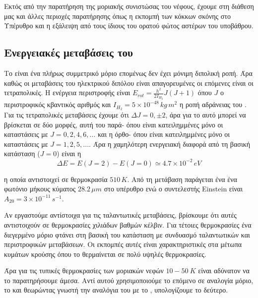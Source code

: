 \documentclass[a4paper,12pt]{memoir}
\begin{document}
Εκτός από την παρατήρηση της μοριακής συνιστώσας του νέφους, έχουμε στη διάθεση μας και άλλες περιοχές παρατήρησης όπως η εκπομπή των κόκκων σκόνης στο Υπέρυθρο και η εξάλειψη από τους ίδιους του ορατού φώτος αστέρων του υποβάθρου.

\subsection{Ενεργειακές μεταβάσεις του }
Το  είναι ένα πλήρως συμμετρικό μόριο επομένως δεν έχει μόνιμη διπολική ροπή. Άρα καθώς οι μεταβάσεις του ηλεκτρικού διπόλου είναι απαγορευμένες οι επόμενες είναι οι τετραπολικές. 
Η ενέργεια περιστροφής είναι $E_{rot}=\frac{h^2}{2I_{H_2}}J(J+1)$ όπου $J$ ο περιστροφικός κβαντικός αριθμός και $I_{H_2}=5\times 10^{-48} \, kg\, m^2$ η ροπή αδράνειας του .
Για τις τετραπολικές μεταβάσεις έχουμε ότι $\Delta J =0,\pm 2$, άρα για το  αυτό μπορεί να βρίσκεται σε δύο μορφές, αυτή του παρά- όπου είναι κατειλημμένες μόνο οι καταστάσεις με $J=0,2,4,6,...$ και η όρθο- όπου είναι κατειλημμένες μόνο οι καταστάσεις με $J=1,2,5,...$. 
Άρα η χαμηλότερη ενεργειακή διαφορά από τη βασική κατάσταση ($J=0$) είναι η 
\begin{equation}
\Delta E=E(J=2)-E(J=0)\simeq 4.7\times 10^{-2}\, eV
\end{equation}

η οποία αντιστοιχεί σε θερμοκρασία $510 \,K$. Από τη μετάβαση παράγεται ένα ένα φωτόνιο μήκους κύματος $28.2\, \mu m$ στο υπέρυθρο ενώ ο συντελεστής Einstein είναι $A_{20}=3\times 10^{-11} \, s^{-1}$.

Αν εργαστούμε αντίστοιχα για τις ταλαντωτικές μεταβάσεις, βρίσκουμε ότι αυτές αντιστοιχούν σε θερμοκρασίες χιλιάδων βαθμών κέλβιν. Για τέτοιες θερμοκρασίες ένα διεγερμένο μόριο  φτάνει στη βασική του κατάσταση με συνδυασμό ταλαντωτικών και περιστροφικών μεταβάσεων. Οι εκπομπές αυτές είναι χαρακτηριστικές στα μέτωπα κυμάτων κρούσης όπου το  θερμαίνεται σε πολύ υψηλές θερμοκρασίες.

Άρα για τις τυπικές θερμοκρασίες των μοριακών νεφών $10-50\ K$ είναι αδύνατον να το παρατηρήσουμε άμεσα. Αντί αυτού χρησιμοποιούμε το επόμενο σε αναλογία μόριο, το  και θεωρώντας γνωστή την αναλόγια του με το , υπολογίζουμε το δεύτερο. 
\end{document}
